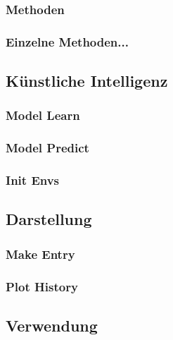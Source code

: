 \subsubsection{Methoden}
\subsubsection{Einzelne Methoden...}
\subsection{Künstliche Intelligenz}
\subsubsection{Model Learn}
\subsubsection{Model Predict}
\subsubsection{Init Envs}
\subsection{Darstellung}
\subsubsection{Make Entry}
\subsubsection{Plot History}
\subsection{Verwendung}